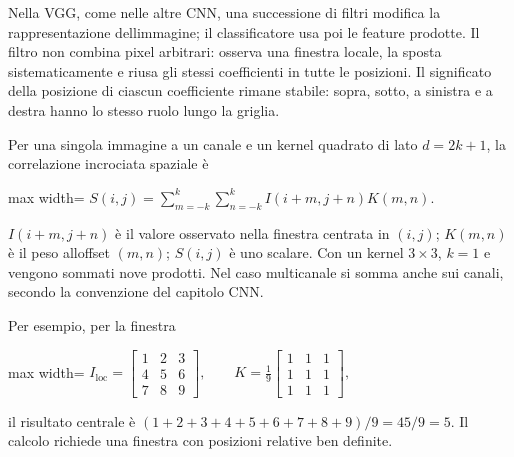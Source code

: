 \documentclass[11pt,a4paper,oneside,openany]{book}
\begin{document}
Nella VGG, come nelle altre CNN, una successione di filtri modifica la rappresentazione dell\textquotesingle immagine; il classificatore usa poi le feature prodotte. Il filtro non combina pixel arbitrari: osserva una finestra locale, la sposta sistematicamente e riusa gli stessi coefficienti in tutte le posizioni. Il significato della posizione di ciascun coefficiente rimane stabile: sopra, sotto, a sinistra e a destra hanno lo stesso ruolo lungo la griglia.

Per una singola immagine a un canale e un kernel quadrato di lato \(d=2k+1\), la correlazione incrociata spaziale è

\begin{center}
\begin{adjustbox}{max width=\linewidth}
$\displaystyle \boxed{S(i,j)=\sum_{m=-k}^{k}\sum_{n=-k}^{k}I(i+m,j+n)K(m,n).}$
\end{adjustbox}
\end{center}

\(I(i+m,j+n)\) è il valore osservato nella finestra centrata in \((i,j)\); \(K(m,n)\) è il peso all\textquotesingle offset \((m,n)\); \(S(i,j)\) è uno scalare. Con un kernel \(3\times3\), \(k=1\) e vengono sommati nove prodotti. Nel caso multicanale si somma anche sui canali, secondo la convenzione del capitolo CNN.

Per esempio, per la finestra

\begin{center}
\begin{adjustbox}{max width=\linewidth}
$\displaystyle I_{\mathrm{loc}}=\begin{bmatrix}1&2&3\\4&5&6\\7&8&9\end{bmatrix},\qquad K=\frac19\begin{bmatrix}1&1&1\\1&1&1\\1&1&1\end{bmatrix},$
\end{adjustbox}
\end{center}

il risultato centrale è \((1+2+3+4+5+6+7+8+9)/9=45/9=5\). Il calcolo richiede una finestra con posizioni relative ben definite.
\end{document}
